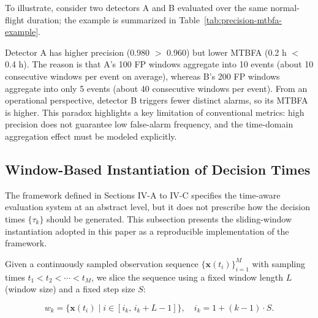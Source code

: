 \documentclass{ieeeaccess}
\begin{document}
To illustrate, consider two detectors A and B evaluated over the same normal-flight duration; the example is summarized in Table~\ref{tab:precision-mtbfa-example}.

\begin{table}[!t]
\caption{Example showing that precision and MTBFA capture different properties.}
\label{tab:precision-mtbfa-example}
\centering
{}
\end{table}


Detector A has higher precision (0.980 $>$ 0.960) but lower MTBFA (0.2 h $<$ 0.4 h). The reason is that A's 100 FP windows aggregate into 10 events (about 10 consecutive windows per event on average), whereas B's 200 FP windows aggregate into only 5 events (about 40 consecutive windows per event). From an operational perspective, detector B triggers fewer distinct alarms, so its MTBFA is higher. This paradox highlights a key limitation of conventional metrics: high precision does not guarantee low false-alarm frequency, and the time-domain aggregation effect must be modeled explicitly.

\subsection{Window-Based Instantiation of Decision Times}

The framework defined in Sections IV-A to IV-C specifies the time-aware evaluation system at an abstract level, but it does not prescribe how the decision times $\{\tau_k\}$ should be generated. This subsection presents the sliding-window instantiation adopted in this paper as a reproducible implementation of the framework.

Given a continuously sampled observation sequence $\{\mathbf{x}(t_i)\}_{i=1}^{M}$ with sampling times $t_1<t_2<\cdots<t_M$, we slice the sequence using a fixed window length $L$ (window size) and a fixed step size $S$:

\begin{equation}
w_k = \{\mathbf{x}(t_i)\mid i\in[i_k,\, i_k+L-1]\},\quad i_k = 1+(k-1)\cdot S.
\end{equation}
\end{document}
